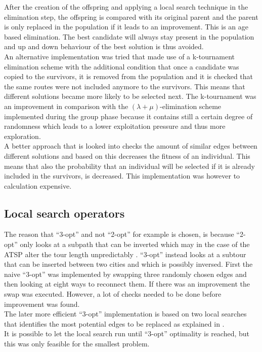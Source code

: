 \documentclass[a4paper,10pt]{article}
\begin{document}
After the creation of the offspring and applying a local search technique in the elimination step, the offspring is compared with its original parent and the parent is only replaced in the population if it leads to an improvement. This is an age based elimination. The best candidate will always stay present in the population and up and down behaviour of the best solution is thus avoided.\\

An alternative implementation was tried that made use of a k-tournament elimination scheme with the additional condition that once a candidate was copied to the survivors, it is removed from the population and it is checked that the same routes were not included anymore to the survivors. This means that different solutions became more likely to be selected next. The k-tournament was an improvement in comparison with the $(\lambda + \mu)$-elimination scheme implemented during the group phase because it contains still a certain degree of randomness which leads to a lower exploitation pressure and thus more exploration.\\
A better approach that is looked into checks the amount of similar edges between different solutions and based on this decreases the fitness of an individual. This means that also the probability that an individual will be selected if it is already included in the survivors, is decreased. This implementation was however to calculation expensive. 

\subsection{Local search operators}\label{s:local_search}

The reason that ``3-opt'' and not ``2-opt'' for example is chosen, is because ``2-opt'' only looks at a subpath that can be inverted which may in the case of the ATSP alter the tour length unpredictably \cite{Reisleben1996}. ``3-opt'' instead looks at a subtour that can be inserted between two cities and which is possibly inversed. First the naive ``3-opt'' was implemented by swapping three randomly chosen edges and then looking at eight ways to reconnect them. If there was an improvement the swap was executed. However, a lot of checks needed to be done before improvement was found.\\ 
The later more efficient ``3-opt'' implementation is based on two local searches that identifies the most potential edges to be replaced as explained in  \cite{fast_alg}.\\
It is possible to let the local search run until ``3-opt'' optimality is reached, but this was only feasible for the smallest problem. 
\end{document}
